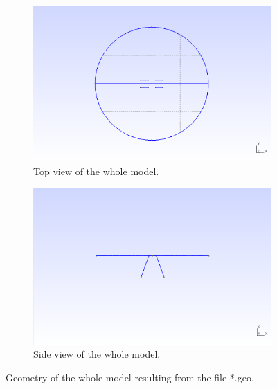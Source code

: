 \documentclass[a4]{article}
\begin{document}
\begin{figure}[tbh!]
	\centering
	\begin{subfigure}[b]{0.48\textwidth}
		\centering
		\includegraphics[width=\textwidth]{geometry_whole1.png}
		\caption{Top view of the whole model.}
		\label{fig:geometry_whole1}
	\end{subfigure}
	\begin{subfigure}[b]{0.48\textwidth}
		\centering
		\includegraphics[width=\textwidth]{geometry_whole2.png}
		\caption{Side view of the whole model.}
		\label{fig:geometry_whole2}
	\end{subfigure}
	\caption{Geometry of the whole model resulting from the file *.geo.}
\label{fig:geometry_2x2_group}
\end{figure}
\end{document}

